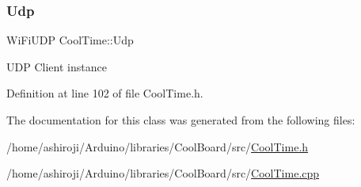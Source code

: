 \subsubsection{\texorpdfstring{Udp}{Udp}}
{\footnotesize\ttfamily Wi\+Fi\+U\+DP Cool\+Time\+::\+Udp\hspace{0.3cm}{\ttfamily [private]}}

U\+DP Client instance 

Definition at line 102 of file Cool\+Time.\+h.



The documentation for this class was generated from the following files\+:\begin{DoxyCompactItemize}
\item 
/home/ashiroji/\+Arduino/libraries/\+Cool\+Board/src/\hyperlink{_cool_time_8h}{Cool\+Time.\+h}\item 
/home/ashiroji/\+Arduino/libraries/\+Cool\+Board/src/\hyperlink{_cool_time_8cpp}{Cool\+Time.\+cpp}\end{DoxyCompactItemize}
